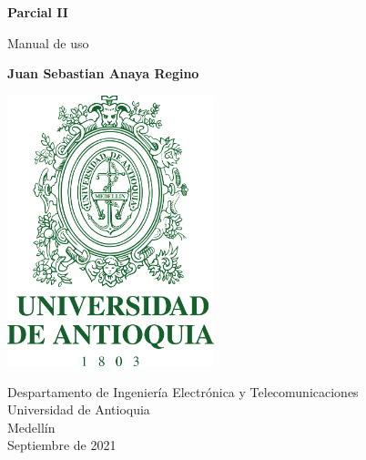 \documentclass{article}
\begin{document}
\begin{titlepage}
    \begin{center}
        \vspace*{1cm}
            
        \Huge
        \textbf{Parcial II}
            
        \vspace{0.5cm}
        \LARGE
        Manual de uso
            
        \vspace{1.5cm}
            
        \textbf{Juan Sebastian Anaya Regino}
            
        \vspace{0.9cm}
        \centering
        \includegraphics[width=6cm]{images/logo.png}
            
        \vfill
            
        \vspace{0.8cm}
            
        \Large
        Despartamento de Ingeniería Electrónica y Telecomunicaciones\\
        Universidad de Antioquia\\
        Medellín\\
        Septiembre de 2021
            
    \end{center}
\end{titlepage}
\end{document}
